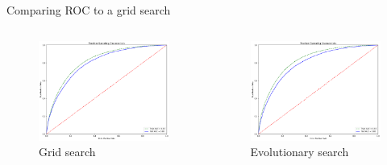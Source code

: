 \begin{frame}{Comparing ROC to a grid search}
    \begin{columns}
        \begin{column}{0.5\textwidth}
            \begin{figure}
                \centering
                \includegraphics[width = \textwidth]{grid_ROC.png}
                \caption{Grid search}
            \end{figure}
        \end{column}
        \begin{column}{0.5\textwidth}
            \begin{figure}
                \centering
                \includegraphics[width = \textwidth]{evo_ROC.png}
                \caption{Evolutionary search}
            \end{figure}
        \end{column}
    \end{columns}
\end{frame}



